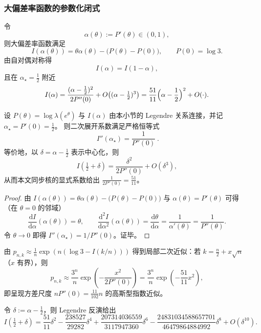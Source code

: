 \subsubsection{大偏差率函数的参数化闭式}\label{app:rate-param}
令
\[
\alpha(\theta):=P'(\theta)\in(0,1),
\]
则大偏差率函数满足
\[
I(\alpha(\theta))=\theta\alpha(\theta)-\bigl(P(\theta)-P(0)\bigr),\qquad P(0)=\log 3.
\]
由自对偶对称得
\[
I(\alpha)=I(1-\alpha),
\]
且在 $\alpha_\star=\frac12$ 附近
\[
I(\alpha)=\frac{(\alpha-\frac12)^2}{2P''(0)}+O\!\left((\alpha-\tfrac12)^3\right)
=\frac{51}{11}\Bigl(\alpha-\frac12\Bigr)^2+O(\cdot).
\]
\begin{proposition}\label{prop:einstein-legendre}
设 \(P(\theta)=\log\lambda(e^\theta)\) 与 \(I(\alpha)\) 由本小节的 Legendre 关系连接，并记 \(\alpha_\star=P'(0)=\tfrac12\)。
则二次展开系数满足严格恒等式
\[
\boxed{\ I''(\alpha_\star)=\frac{1}{P''(0)}\ }.
\]
等价地，以 \(\delta=\alpha-\tfrac12\) 表示中心化，则
\[
I\!\left(\tfrac12+\delta\right)=\frac{\delta^2}{2P''(0)}+O(\delta^3),
\]
从而本文同步核的显式系数给出 \( \frac{1}{2P''(0)}=\frac{51}{11}\)。
\end{proposition}
\begin{proof}
由 \(I(\alpha(\theta))=\theta\alpha(\theta)-\bigl(P(\theta)-P(0)\bigr)\) 与 \(\alpha(\theta)=P'(\theta)\) 可得（在 \(\theta=0\) 的邻域）
\[
\frac{\mathrm{d}I}{\mathrm{d}\alpha}(\alpha(\theta))=\theta,
\qquad
\frac{\mathrm{d}^2 I}{\mathrm{d}\alpha^2}(\alpha(\theta))=\frac{\mathrm{d}\theta}{\mathrm{d}\alpha}=\frac{1}{\alpha'(\theta)}=\frac{1}{P''(\theta)}.
\]
令 \(\theta\to 0\) 即得 \(I''(\alpha_\star)=1/P''(0)\)。证毕。
\end{proof}
由 $p_{n,k}\approx \frac{1}{n}\exp(n(\log 3-I(k/n)))$ 得到局部二次近似：若
\(
k=\frac{n}{2}+x\sqrt{n}
\)
（$x$ 有界），则
\[
p_{n,k}\approx \frac{3^n}{n}\exp\!\left(-\frac{x^2}{2P''(0)}\right)
=\frac{3^n}{n}\exp\!\left(-\frac{51}{11}x^2\right),
\]
即呈现方差尺度 $nP''(0)=\frac{11}{102}n$ 的高斯型指数近似。
\begin{corollary}\label{cor:moderate-deviation}
令 $\delta:=\alpha-\frac12$，则 Legendre 反演给出
\[
I\!\left(\tfrac12+\delta\right)
=\frac{51}{11}\delta^2
-\frac{238527}{29282}\delta^4
+\frac{207314036559}{3117947360}\delta^6
-\frac{24831034588657701}{46479864884992}\delta^8
+O(\delta^{10}).
\]
\end{corollary}
